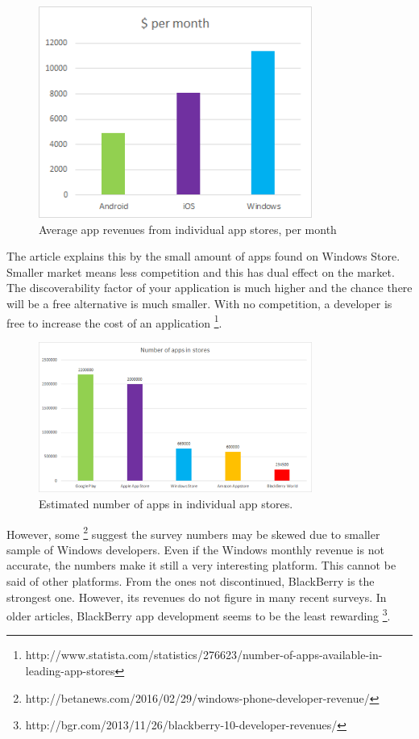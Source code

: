 \documentclass[english,master,public,dept460,male,cpdeclaration,oneside]{diploma}
\begin{document}
\begin{figure}
	\centering\includegraphics[width=0.8\textwidth]{Figures/appRevenues.png}
	\caption{Average app revenues from individual app stores, per month}
\end{figure}

The article explains this by the small amount of apps found on Windows Store. Smaller market means less competition and this has dual effect on the market. The discoverability factor of your application is much higher and the chance there will be a free alternative is much smaller. With no competition, a developer is free to increase the cost of an application \footnote{http://www.statista.com/statistics/276623/number-of-apps-available-in-leading-app-stores}.

\begin{figure}
	\centering\includegraphics[width=0.8\textwidth]{Figures/appsInStores.png}
	\caption{Estimated number of apps in individual app stores.}
\end{figure}

However, some \footnote{http://betanews.com/2016/02/29/windows-phone-developer-revenue/} suggest the survey numbers may be skewed due to smaller sample of Windows developers. Even if the Windows monthly revenue is not accurate, the numbers make it still a very interesting platform. This cannot be said of other platforms. From the ones not discontinued, BlackBerry is the strongest one. However, its revenues do not figure in many recent surveys. In older articles, BlackBerry app development seems to be the least rewarding \footnote{http://bgr.com/2013/11/26/blackberry-10-developer-revenues/}. 
\end{document}

